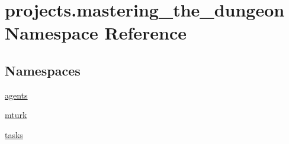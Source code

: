 \hypertarget{namespaceprojects_1_1mastering__the__dungeon}{}\section{projects.\+mastering\+\_\+the\+\_\+dungeon Namespace Reference}
\label{namespaceprojects_1_1mastering__the__dungeon}
\subsection*{Namespaces}
\begin{DoxyCompactItemize}
\item 
 \hyperlink{namespaceprojects_1_1mastering__the__dungeon_1_1agents}{agents}
\item 
 \hyperlink{namespaceprojects_1_1mastering__the__dungeon_1_1mturk}{mturk}
\item 
 \hyperlink{namespaceprojects_1_1mastering__the__dungeon_1_1tasks}{tasks}
\end{DoxyCompactItemize}
